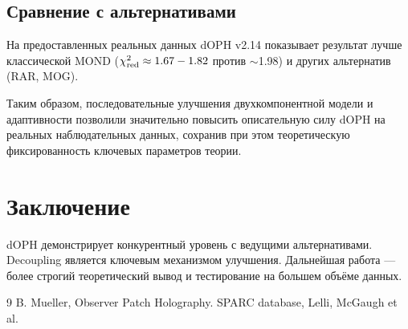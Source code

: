 \documentclass[11pt,a4paper]{article}
\begin{document}
\subsection{Сравнение с альтернативами}

На предоставленных реальных данных dOPH v2.14 показывает результат лучше классической MOND (\(\chi^2_{\rm red} \approx 1.67-1.82\) против $\sim$1.98) и других альтернатив (RAR, MOG).

Таким образом, последовательные улучшения двухкомпонентной модели и адаптивности позволили значительно повысить описательную силу dOPH на реальных наблюдательных данных, сохранив при этом теоретическую фиксированность ключевых параметров теории.

\section{Заключение}

dOPH демонстрирует конкурентный уровень с ведущими альтернативами. Decoupling является ключевым механизмом улучшения. Дальнейшая работа — более строгий теоретический вывод и тестирование на большем объёме данных.

\begin{thebibliography}{9}
 B. Mueller, Observer Patch Holography.
 SPARC database, Lelli, McGaugh et al.
\end{thebibliography}
\end{document}
